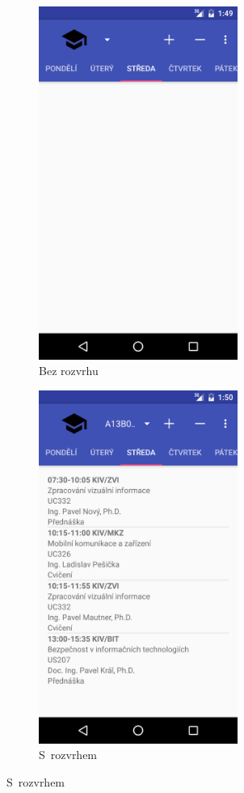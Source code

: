 \documentclass[12pt, a4paper]{article}
\begin{document}
		\begin{figure}[ht!]
			\centering
			\caption{Hlavní obrazovka}
			\label{main}
			\begin{subfigure}{.5\textwidth}
				\centering
				\caption{Bez rozvrhu}
				\label{mainWithout}
				\includegraphics[width=6.5cm]{img/mainWithoutTimetable.png}
			\end{subfigure}%
			\begin{subfigure}{.5\textwidth}
				\centering
				\caption{S~rozvrhem}
				\label{mainWith}
				\includegraphics[width=6.5cm]{img/mainWithTimetable.png}

\end{subfigure}
\end{figure}
\end{document}
